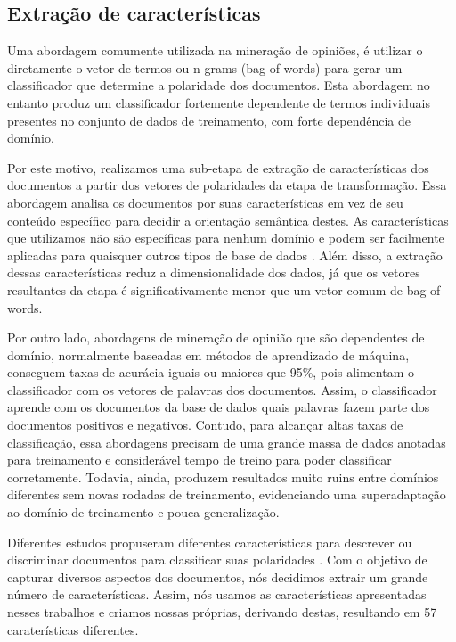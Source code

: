 \subsection{Extração de características}

Uma abordagem comumente utilizada na mineração de opiniões, é utilizar o diretamente o vetor de termos ou n-grams (bag-of-words) para gerar um classificador que determine a polaridade dos documentos. Esta abordagem no entanto produz um classificador fortemente dependente de termos individuais presentes no conjunto de dados de treinamento, com forte dependência de domínio. 

Por este motivo, realizamos uma sub-etapa de extração de características dos documentos a partir dos vetores de polaridades da etapa de transformação. Essa abordagem  analisa os documentos por suas características em vez de seu conteúdo específico para decidir a orientação semântica  destes. As características que utilizamos não são específicas para nenhum domínio e podem ser facilmente aplicadas para quaisquer outros tipos de base de dados \cite{pang2002thumbs}. Além disso, a extração dessas características reduz a dimensionalidade dos dados, já que os vetores resultantes da etapa é significativamente menor que um vetor comum de bag-of-words.

Por outro lado, abordagens de mineração de opinião que são dependentes de domínio, normalmente baseadas em métodos de aprendizado de máquina, conseguem taxas de acurácia iguais ou maiores que 95\%, pois alimentam o classificador com os vetores de palavras dos documentos. Assim, o classificador aprende com os documentos da base de dados quais palavras fazem parte dos documentos positivos e negativos. Contudo, para alcançar altas taxas de classificação, essa abordagens precisam de uma grande massa de dados anotadas para treinamento e considerável tempo de treino para poder classificar corretamente. Todavia, ainda, produzem resultados muito ruins entre domínios diferentes sem novas rodadas de treinamento, evidenciando uma superadaptação ao domínio de treinamento e pouca generalização.

Diferentes estudos propuseram diferentes características para descrever ou discriminar documentos para classificar suas polaridades \cite{wilson2005recognizing, ohana2009sentiment, taboada2011lexicon}. Com o objetivo de capturar diversos aspectos dos documentos, nós decidimos extrair um grande número de características. Assim, nós usamos as características apresentadas nesses trabalhos e criamos nossas próprias, derivando destas, resultando em 57 caraterísticas diferentes.

